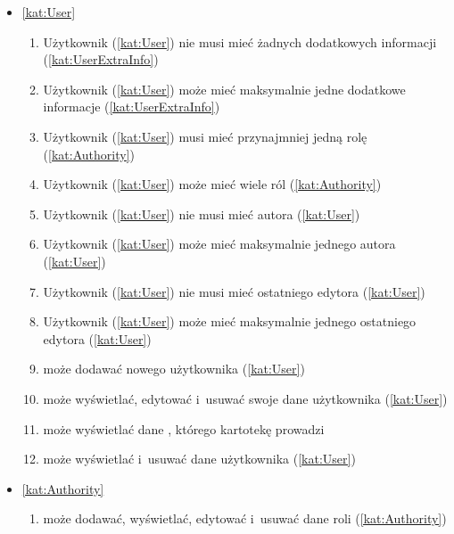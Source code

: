 \begin{itemize}[label={\textbf{Reguły dla}}, wide, labelwidth=!, labelindent=0pt]
    \setlength\itemsep{1.75em}
    \item\ref{kat:User}\mynobreakpar
    \begin{enumerate}[label={\textbf{REG/0/\protect\twodigits{\arabic{enumi}}}}, wide, labelwidth=!, align=left, leftmargin=3cm]
        \item Użytkownik (\ref{kat:User}) nie musi mieć żadnych dodatkowych informacji (\ref{kat:UserExtraInfo})
        \item Użytkownik (\ref{kat:User}) może mieć maksymalnie jedne dodatkowe informacje (\ref{kat:UserExtraInfo})
        \item Użytkownik (\ref{kat:User}) musi mieć przynajmniej jedną rolę (\ref{kat:Authority})
        \item Użytkownik (\ref{kat:User}) może mieć wiele ról (\ref{kat:Authority})
        \item Użytkownik (\ref{kat:User}) nie musi mieć autora (\ref{kat:User})
        \item Użytkownik (\ref{kat:User}) może mieć maksymalnie jednego autora (\ref{kat:User})
        \item Użytkownik (\ref{kat:User}) nie musi mieć ostatniego edytora (\ref{kat:User})
        \item Użytkownik (\ref{kat:User}) może mieć maksymalnie jednego ostatniego edytora (\ref{kat:User})
        \item {} może dodawać nowego użytkownika (\ref{kat:User})
        \item {} może wyświetlać, edytować i~usuwać swoje dane użytkownika (\ref{kat:User})
        \item {} może wyświetlać dane , którego kartotekę prowadzi
        \item {} może wyświetlać i~usuwać dane użytkownika (\ref{kat:User})
    \end{enumerate}
    \item\ref{kat:Authority}\mynobreakpar
    \begin{enumerate}[label={\textbf{REG/0/\protect\twodigits{\arabic{enumi}}}}, wide, labelwidth=!, align=left, leftmargin=3cm, resume]
        \item {} może dodawać, wyświetlać, edytować i~usuwać dane roli (\ref{kat:Authority})
    \end{enumerate}

\end{itemize}
